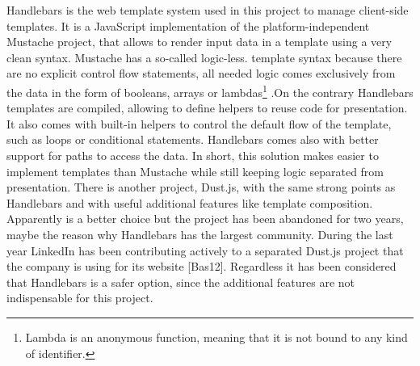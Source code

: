 Handlebars is the web template system used in this project to manage client-side templates. It is a JavaScript implementation of the platform-independent Mustache project, that allows to render input data in a template using a very clean syntax. Mustache has a so-called logic-less. template syntax because there are no explicit control flow statements, all needed logic comes exclusively from the data in the form of booleans, arrays or lambdas\footnote{Lambda is an anonymous function, meaning that it is not bound to any kind of identifier.} .On the contrary Handlebars templates are compiled, allowing to define helpers to reuse code for presentation. It also comes with built-in helpers to control the default flow of the template, such as loops or conditional statements. Handlebars comes also with better support for paths
to access the data. In short, this solution makes easier to implement templates than Mustache while still keeping logic separated from presentation. There is another project, Dust.js, with the same strong points as Handlebars and with useful additional features like template composition. Apparently is a better choice but the project has been abandoned for two years, maybe the reason why Handlebars has the largest community. During the last year LinkedIn has been contributing actively to a separated Dust.js project that
the company is using for its website [Bas12]. Regardless it has been considered that Handlebars is a safer option, since the additional features are not indispensable for this project.
